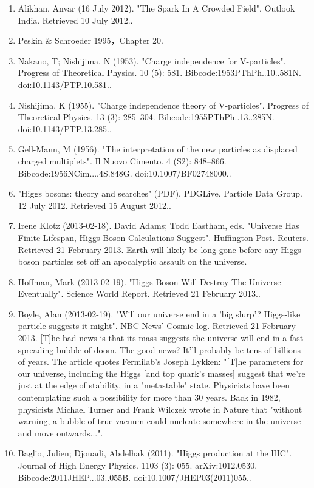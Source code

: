 \begin{enumerate}
    \item Alikhan, Anvar (16 July 2012). "The Spark In A Crowded Field". Outlook India. Retrieved 10 July 2012..
    \item Peskin & Schroeder 1995，Chapter 20.
    \item Nakano, T; Nishijima, N (1953). "Charge independence for V-particles". Progress of Theoretical Physics. 10 (5): 581. Bibcode:1953PThPh..10..581N. doi:10.1143/PTP.10.581..
    \item Nishijima, K (1955). "Charge independence theory of V-particles". Progress of Theoretical Physics. 13 (3): 285–304. Bibcode:1955PThPh..13..285N. doi:10.1143/PTP.13.285..
    \item Gell-Mann, M (1956). "The interpretation of the new particles as displaced charged multiplets". Il Nuovo Cimento. 4 (S2): 848–866. Bibcode:1956NCim....4S.848G. doi:10.1007/BF02748000..
    \item "Higgs bosons: theory and searches" (PDF). PDGLive. Particle Data Group. 12 July 2012. Retrieved 15 August 2012..
    \item Irene Klotz (2013-02-18). David Adams; Todd Eastham, eds. "Universe Has Finite Lifespan, Higgs Boson Calculations Suggest". Huffington Post. Reuters. Retrieved 21 February 2013. Earth will likely be long gone before any Higgs boson particles set off an apocalyptic assault on the universe.
    \item Hoffman, Mark (2013-02-19). "Higgs Boson Will Destroy The Universe Eventually". Science World Report. Retrieved 21 February 2013..
    \item Boyle, Alan (2013-02-19). "Will our universe end in a 'big slurp'? Higgs-like particle suggests it might". NBC News' Cosmic log. Retrieved 21 February 2013. [T]he bad news is that its mass suggests the universe will end in a fast-spreading bubble of doom. The good news? It'll probably be tens of billions of years. The article quotes Fermilab's Joseph Lykken: "[T]he parameters for our universe, including the Higgs [and top quark's masses] suggest that we're just at the edge of stability, in a "metastable" state. Physicists have been contemplating such a possibility for more than 30 years. Back in 1982, physicists Michael Turner and Frank Wilczek wrote in Nature that "without warning, a bubble of true vacuum could nucleate somewhere in the universe and move outwards...".
    \item Baglio, Julien; Djouadi, Abdelhak (2011). "Higgs production at the lHC". Journal of High Energy Physics. 1103 (3): 055. arXiv:1012.0530. Bibcode:2011JHEP...03..055B. doi:10.1007/JHEP03(2011)055..

\end{enumerate}
